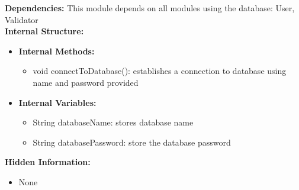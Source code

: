 \textbf{Dependencies:}
        	This module depends on all modules using the database: User, Validator\\
\textbf{Internal Structure:}
\begin{itemize}
\item \textbf{Internal Methods:}
\begin{itemize}
\item                    	void connectToDatabase(): establishes a connection to database using name and password provided
\end{itemize}
\item \textbf{Internal Variables:}
\begin{itemize}
\item                    	String databaseName: stores database name
     \item   	        	String databasePassword: store the database password
 \end{itemize}
\end{itemize}
\textbf{Hidden Information:}
\begin{itemize}
\item None
\end{itemize}

